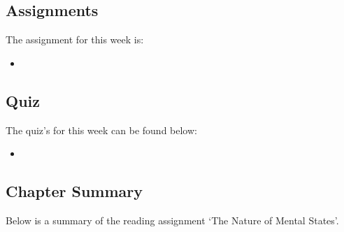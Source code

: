 \subsection{Assignments}

The assignment for this week is:

\begin{itemize}
    \item {}
\end{itemize}

\subsection{Quiz}

The quiz's for this week can be found below:

\begin{itemize}
    \item {}
\end{itemize}

\newpage

\subsection{Chapter Summary}

Below is a summary of the reading assignment `The Nature of Mental States'.

